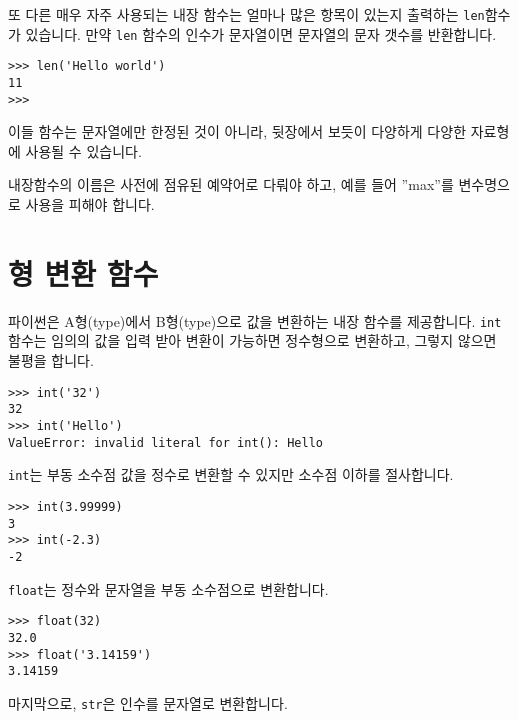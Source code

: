 또 다른 매우 자주 사용되는 내장 함수는 얼마나 많은 항목이 있는지 출력하는 {\tt len}함수가 있습니다.
만약 {\tt len} 함수의 인수가 문자열이면 문자열의 문자 갯수를 반환합니다.

\beforeverb
\begin{verbatim}
>>> len('Hello world')
11
>>>
\end{verbatim}
\afterverb
%

이들 함수는 문자열에만 한정된 것이 아니라, 뒷장에서 보듯이 다양하게 다양한 자료형에 사용될 수 있습니다.

내장함수의 이름은 사전에 점유된 예약어로 다뤄야 하고, 예를 들어 ''max''를 변수명으로 사용을 피해야 합니다.


\section{형 변환 함수}



파이썬은 A형(type)에서 B형(type)으로 값을 변환하는 내장 함수를 제공합니다.
{\tt int}함수는 임의의 값을 입력 받아 변환이 가능하면 정수형으로 변환하고, 그렇지 않으면 불평을 합니다.


\beforeverb
\begin{verbatim}
>>> int('32')
32
>>> int('Hello')
ValueError: invalid literal for int(): Hello
\end{verbatim}
\afterverb
%

{\tt int}는 부동 소수점 값을 정수로 변환할 수 있지만 소수점 이하를 절사합니다.

\beforeverb
\begin{verbatim}
>>> int(3.99999)
3
>>> int(-2.3)
-2
\end{verbatim}
\afterverb
%

{\tt float}는 정수와 문자열을 부동 소수점으로 변환합니다.


\beforeverb
\begin{verbatim}
>>> float(32)
32.0
>>> float('3.14159')
3.14159
\end{verbatim}
\afterverb
%

마지막으로, {\tt str}은 인수를 문자열로 변환합니다.


